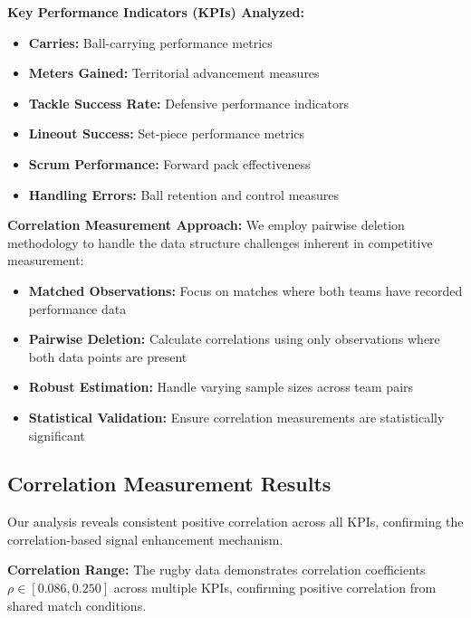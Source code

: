 \textbf{Key Performance Indicators (KPIs) Analyzed:}
\begin{itemize}
    \item \textbf{Carries:} Ball-carrying performance metrics
    \item \textbf{Meters Gained:} Territorial advancement measures
    \item \textbf{Tackle Success Rate:} Defensive performance indicators
    \item \textbf{Lineout Success:} Set-piece performance metrics
    \item \textbf{Scrum Performance:} Forward pack effectiveness
    \item \textbf{Handling Errors:} Ball retention and control measures
\end{itemize}

\textbf{Correlation Measurement Approach:}
We employ pairwise deletion methodology to handle the data structure challenges inherent in competitive measurement:
\begin{itemize}
    \item \textbf{Matched Observations:} Focus on matches where both teams have recorded performance data
    \item \textbf{Pairwise Deletion:} Calculate correlations using only observations where both data points are present
    \item \textbf{Robust Estimation:} Handle varying sample sizes across team pairs
    \item \textbf{Statistical Validation:} Ensure correlation measurements are statistically significant
\end{itemize}

\subsection{Correlation Measurement Results}

Our analysis reveals consistent positive correlation across all KPIs, confirming the correlation-based signal enhancement mechanism.

\textbf{Correlation Range:}
The rugby data demonstrates correlation coefficients $\rho \in [0.086, 0.250]$ across multiple KPIs, confirming positive correlation from shared match conditions.

